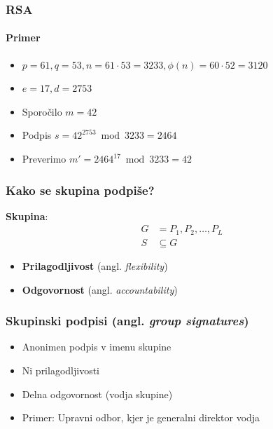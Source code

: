 \documentclass{beamer}    %
\begin{document}
\begin{frame}[fragile]
    \frametitle{RSA}
    \framesubtitle{Primer}
    \begin{itemize}
        \item $p = 61, q = 53, n = 61 \cdot 53 = 3233, \phi(n) = 60 \cdot 52 = 3120$
        \item $e = 17, d = 2753$
        \item Sporočilo $m = 42$
        \item Podpis $s = 42^{2753} \bmod 3233 = 2464$
        \item Preverimo $m' = 2464^{17} \bmod 3233 = 42$
    \end{itemize}

\end{frame}

\begin{frame}
    \frametitle{Kako se skupina podpiše?}
    \textbf{Skupina}: 
    \begin{align*}
        G &= P_1, P_2, \dots, P_L \\
        S &\subseteq G
    \end{align*}
    \vspace{1cm}
    \begin{itemize}
        \item \textbf{Prilagodljivost} (angl. \textit{flexibility})
        \item \textbf{Odgovornost} (angl. \textit{accountability})
    \end{itemize}
\end{frame}

\begin{frame}
    \frametitle{Skupinski podpisi (angl. \textit{group signatures})}
    \begin{itemize}
        \item Anonimen podpis v imenu skupine
        \item Ni prilagodljivosti
        \item Delna odgovornost (vodja skupine)
        \item Primer: Upravni odbor, kjer je generalni direktor vodja
    \end{itemize}
\end{frame}
\end{document}
